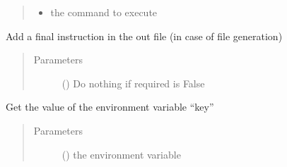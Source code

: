 \documentclass[a4paper,10pt,english]{sphinxmanual}
\begin{document}
\begin{fulllineitems}
\begin{fulllineitems}
\begin{quote}
\begin{description}
\begin{itemize}
\item {} 
 \textendash{} the command to execute

\end{itemize}

\end{description}\end{quote}

\end{fulllineitems}


\begin{fulllineitems}
\label{\detokenize{commands/apidoc/src:src.fileEnviron.ContextFileEnviron.finish}}
Add a final instruction in the out file (in case of file generation)
\begin{quote}\begin{description}
\item[{Parameters}] \leavevmode
{} () \textendash{} Do nothing if required is False

\end{description}\end{quote}

\end{fulllineitems}


\begin{fulllineitems}
\label{\detokenize{commands/apidoc/src:src.fileEnviron.ContextFileEnviron.get}}
Get the value of the environment variable “key”
\begin{quote}\begin{description}
\item[{Parameters}] \leavevmode
{} () \textendash{} the environment variable

\end{description}\end{quote}

\end{fulllineitems}



\end{fulllineitems}
\end{document}
